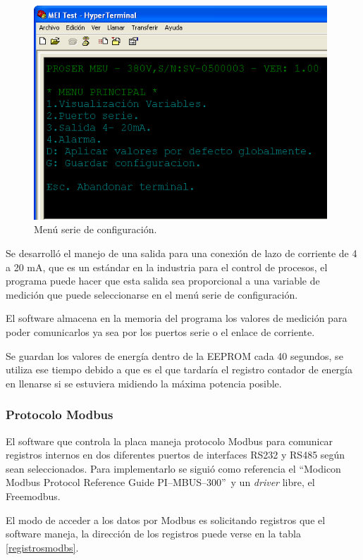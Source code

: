 \begin{figure}[!htb]
	\centering
	\includegraphics[width=110mm,keepaspectratio]{Figures/MenuUsuario1.png}
	\caption{Menú serie de configuración.}
	\label{fig:serialmenu}
\end{figure}

Se desarrolló el manejo de una salida para una conexión de lazo de corriente de 4 a 20 mA, que es un estándar en la industria para el control de procesos,  el programa puede hacer que esta salida sea proporcional a una variable de medición que puede seleccionarse en el menú serie de configuración.

El software almacena en la memoria del programa los valores de medición para poder comunicarlos ya sea por los puertos serie o el enlace de corriente.

Se guardan los valores de energía dentro de la EEPROM cada 40 segundos, se utiliza ese tiempo debido a que es el que tardaría el registro contador de energía en llenarse si se estuviera midiendo la máxima potencia posible.

\subsubsection{Protocolo Modbus }

El software que controla la placa maneja protocolo Modbus para comunicar registros internos en dos diferentes puertos de interfaces RS232 y RS485 según sean seleccionados. Para implementarlo se siguió como referencia el \textquotedblleft Modicon Modbus Protocol Reference Guide PI–MBUS–300\textquotedblright \ y un \textit{driver} libre, el Freemodbus.

El modo de acceder a los datos por Modbus es solicitando registros que el software maneja, la dirección de los registros puede verse en la tabla \ref{registrosmodbs}.

